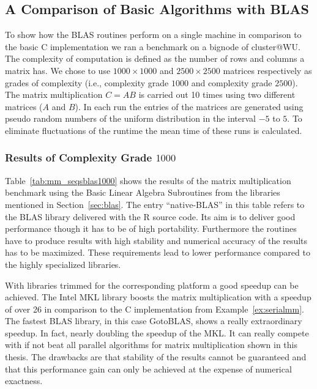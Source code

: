 


\subsection{A Comparison of Basic Algorithms with BLAS}

To show how the BLAS routines perform on a single machine in
comparison to the basic C implementation we ran a benchmark on a
bignode of cluster@WU. The complexity of computation is defined as the
number of rows and columns a matrix has. We chose to use $1000
\times 1000$  and $2500 \times
2500$ matrices respectively as grades of complexity (i.e., complexity
grade $1000$ and complexity grade $2500$). The matrix multiplication
$C = AB$ is carried out 10 times using two different matrices ($A$
and  $B$). In each run the entries of the matrices are generated using
pseudo random 
numbers of the uniform
distribution in the interval $-5$ to $5$. To eliminate fluctuations of the
runtime the mean time of these runs is calculated.

\subsubsection{Results of Complexity Grade $1000$}

Table~\ref{tab:mm_seqsblas1000} shows the results of the matrix
multiplication benchmark using the Basic Linear Algebra Subroutines
from the libraries mentioned in Section~\ref{sec:blas}. The entry
``native-BLAS'' in this table refers to the BLAS library delivered
with the R source code. Its aim is to deliver good performance though
it has to be of high portability. Furthermore the routines have to
produce results with high stability and numerical accuracy of the
results has to be maximized. These requirements lead to lower
performance compared to the highly specialized libraries.

 
With libraries trimmed for the
corresponding platform a good speedup can be achieved. The Intel MKL
library boosts the matrix multiplication with a speedup of over 26 in
comparison to the C implementation from Example~\ref{ex:serialmm}. The
fastest BLAS library, in 
this case GotoBLAS, shows a really extraordinary speedup. In fact,
nearly doubling the speedup of the MKL. It
can really compete with if not beat all parallel algorithms for matrix
multiplication shown in this thesis. The drawbacks are that stability
of the results cannot be guaranteed and that this performance gain can
only be achieved at the expense of numerical exactness.

